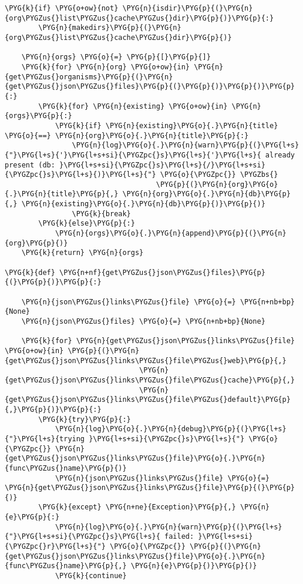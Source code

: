 \begin{Verbatim}[commandchars=\\\{\}]
    \PYG{k}{if} \PYG{o+ow}{not} \PYG{n}{isdir}\PYG{p}{(}\PYG{n}{org\PYGZus{}list\PYGZus{}cache\PYGZus{}dir}\PYG{p}{)}\PYG{p}{:}
        \PYG{n}{makedirs}\PYG{p}{(}\PYG{n}{org\PYGZus{}list\PYGZus{}cache\PYGZus{}dir}\PYG{p}{)}

    \PYG{n}{orgs} \PYG{o}{=} \PYG{p}{[}\PYG{p}{]}
    \PYG{k}{for} \PYG{n}{org} \PYG{o+ow}{in} \PYG{n}{get\PYGZus{}organisms}\PYG{p}{(}\PYG{n}{get\PYGZus{}json\PYGZus{}files}\PYG{p}{(}\PYG{p}{)}\PYG{p}{)}\PYG{p}{:}
        \PYG{k}{for} \PYG{n}{existing} \PYG{o+ow}{in} \PYG{n}{orgs}\PYG{p}{:}
            \PYG{k}{if} \PYG{n}{existing}\PYG{o}{.}\PYG{n}{title} \PYG{o}{==} \PYG{n}{org}\PYG{o}{.}\PYG{n}{title}\PYG{p}{:}
                \PYG{n}{log}\PYG{o}{.}\PYG{n}{warn}\PYG{p}{(}\PYG{l+s}{"}\PYG{l+s}{'}\PYG{l+s+si}{\PYGZpc{}s}\PYG{l+s}{'}\PYG{l+s}{ already present (db: }\PYG{l+s+si}{\PYGZpc{}s}\PYG{l+s}{/}\PYG{l+s+si}{\PYGZpc{}s}\PYG{l+s}{)}\PYG{l+s}{"} \PYG{o}{\PYGZpc{}} \PYGZbs{}
                                    \PYG{p}{(}\PYG{n}{org}\PYG{o}{.}\PYG{n}{title}\PYG{p}{,} \PYG{n}{org}\PYG{o}{.}\PYG{n}{db}\PYG{p}{,} \PYG{n}{existing}\PYG{o}{.}\PYG{n}{db}\PYG{p}{)}\PYG{p}{)}
                \PYG{k}{break}
        \PYG{k}{else}\PYG{p}{:}
            \PYG{n}{orgs}\PYG{o}{.}\PYG{n}{append}\PYG{p}{(}\PYG{n}{org}\PYG{p}{)}
    \PYG{k}{return} \PYG{n}{orgs}

\PYG{k}{def} \PYG{n+nf}{get\PYGZus{}json\PYGZus{}files}\PYG{p}{(}\PYG{p}{)}\PYG{p}{:}

    \PYG{n}{json\PYGZus{}links\PYGZus{}file} \PYG{o}{=} \PYG{n+nb+bp}{None}
    \PYG{n}{json\PYGZus{}files} \PYG{o}{=} \PYG{n+nb+bp}{None}

    \PYG{k}{for} \PYG{n}{get\PYGZus{}json\PYGZus{}links\PYGZus{}file} \PYG{o+ow}{in} \PYG{p}{(}\PYG{n}{get\PYGZus{}json\PYGZus{}links\PYGZus{}file\PYGZus{}web}\PYG{p}{,}
                                \PYG{n}{get\PYGZus{}json\PYGZus{}links\PYGZus{}file\PYGZus{}cache}\PYG{p}{,}
                                \PYG{n}{get\PYGZus{}json\PYGZus{}links\PYGZus{}file\PYGZus{}default}\PYG{p}{,}\PYG{p}{)}\PYG{p}{:}
        \PYG{k}{try}\PYG{p}{:}
            \PYG{n}{log}\PYG{o}{.}\PYG{n}{debug}\PYG{p}{(}\PYG{l+s}{"}\PYG{l+s}{trying }\PYG{l+s+si}{\PYGZpc{}s}\PYG{l+s}{"} \PYG{o}{\PYGZpc{}} \PYG{n}{get\PYGZus{}json\PYGZus{}links\PYGZus{}file}\PYG{o}{.}\PYG{n}{func\PYGZus{}name}\PYG{p}{)}
            \PYG{n}{json\PYGZus{}links\PYGZus{}file} \PYG{o}{=} \PYG{n}{get\PYGZus{}json\PYGZus{}links\PYGZus{}file}\PYG{p}{(}\PYG{p}{)}
        \PYG{k}{except} \PYG{n+ne}{Exception}\PYG{p}{,} \PYG{n}{e}\PYG{p}{:}
            \PYG{n}{log}\PYG{o}{.}\PYG{n}{warn}\PYG{p}{(}\PYG{l+s}{"}\PYG{l+s+si}{\PYGZpc{}s}\PYG{l+s}{ failed: }\PYG{l+s+si}{\PYGZpc{}r}\PYG{l+s}{"} \PYG{o}{\PYGZpc{}} \PYG{p}{(}\PYG{n}{get\PYGZus{}json\PYGZus{}links\PYGZus{}file}\PYG{o}{.}\PYG{n}{func\PYGZus{}name}\PYG{p}{,} \PYG{n}{e}\PYG{p}{)}\PYG{p}{)}
            \PYG{k}{continue}
        

\end{Verbatim}
